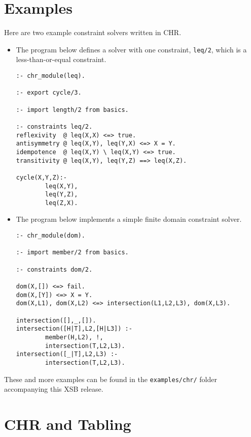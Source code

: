 \section{Examples} \label{examples}

Here are two example constraint solvers written in CHR.

\begin{itemize}

\item
The program below defines a solver with one constraint, 
\texttt{leq/2}, which is a less-than-or-equal constraint.

\begin{verbatim}
:- chr_module(leq).

:- export cycle/3.

:- import length/2 from basics.

:- constraints leq/2.
reflexivity  @ leq(X,X) <=> true.
antisymmetry @ leq(X,Y), leq(Y,X) <=> X = Y.
idempotence  @ leq(X,Y) \ leq(X,Y) <=> true.
transitivity @ leq(X,Y), leq(Y,Z) ==> leq(X,Z).

cycle(X,Y,Z):-
        leq(X,Y),
        leq(Y,Z),
        leq(Z,X).
\end{verbatim}

\item
The program below implements a simple finite domain
constraint solver.

\begin{verbatim}
:- chr_module(dom).

:- import member/2 from basics.

:- constraints dom/2. 

dom(X,[]) <=> fail.
dom(X,[Y]) <=> X = Y.
dom(X,L1), dom(X,L2) <=> intersection(L1,L2,L3), dom(X,L3).

intersection([],_,[]).
intersection([H|T],L2,[H|L3]) :-
        member(H,L2), !,
        intersection(T,L2,L3).
intersection([_|T],L2,L3) :-
        intersection(T,L2,L3).
\end{verbatim}
		
\end{itemize}

These and more examples can be found in the \texttt{examples/chr/} folder accompanying
this XSB release.

\section{CHR and Tabling} \label{TCHR}

